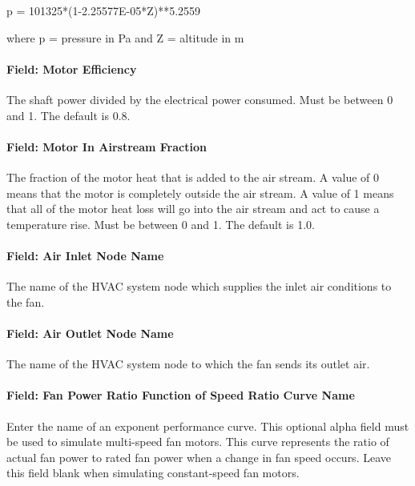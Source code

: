 p = 101325*(1-2.25577E-05*Z)**5.2559

where p = pressure in Pa and Z = altitude in m

\paragraph{Field: Motor Efficiency}\label{field-motor-efficiency-1}

The shaft power divided by the electrical power consumed. Must be between 0 and 1. The default is 0.8.

\paragraph{Field: Motor In Airstream Fraction}\label{field-motor-in-airstream-fraction-1}

The fraction of the motor heat that is added to the air stream. A value of 0 means that the motor is completely outside the air stream. A value of 1 means that all of the motor heat loss will go into the air stream and act to cause a temperature rise. Must be between 0 and 1. The default is 1.0.

\paragraph{Field: Air Inlet Node Name}\label{field-air-inlet-node-name-1-002}

The name of the HVAC system node which supplies the inlet air conditions to the fan.

\paragraph{Field: Air Outlet Node Name}\label{field-air-outlet-node-name-1-001}

The name of the HVAC system node to which the fan sends its outlet air.

\paragraph{Field: Fan Power Ratio Function of Speed Ratio Curve Name}\label{field-fan-power-ratio-function-of-speed-ratio-curve-name}

Enter the name of an exponent performance curve. This optional alpha field must be used to simulate multi-speed fan motors. This curve represents the ratio of actual fan power to rated fan power when a change in fan speed occurs. Leave this field blank when simulating constant-speed fan motors.

